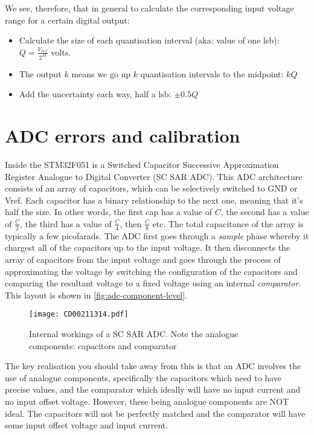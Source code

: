 We see, therefore, that in general to calculate the corresponding input voltage range for a certain digital output:
\begin{itemize}
  \item Calculate the size of each quantisation interval (aka: value of one lsb): \(Q = \frac{V_{ref}}{2^M}\) volts.
  \item The output \(k\) means we go up \(k\) quantisation intervals to the midpoint: \(kQ\)
  \item Add the uncertainty each way, half a lsb: \(\pm 0.5Q\)
\end{itemize}

\section{ADC errors and calibration}
Inside the STM32F051 is a Switched Capacitor Successive Approximation Register Analogue to Digital Converter (SC SAR ADC). 
This ADC architecture consists of an array of capacitors, which can be selectively switched to GND or Vref. 
Each capacitor has a binary relationship to the next one, meaning that it's half the size. 
In other words, the first cap has a value of \(C\), the second has a value of \(\frac{C}{2}\), the third has a value of \(\frac{C}{4}\), then \(\frac{C}{8}\) etc.
The total capacitance of the array is typically a few picofarads. 
The ADC first goes through a \emph{sample} phase whereby it chargest all of the capacitors up to the input voltage. It then disconnects the array of capacitors from the input voltage and goes through the process of approximating the voltage by switching the configuration of the capacitors and comparing the resultant voltage to a fixed voltage using an internal \emph{comparator}. This layout is shown in \autoref{fig:adc-component-level}. 

\begin{figure}
\centering
\texttt{[image: CD00211314.pdf]}
\caption{Internal workings of a SC SAR ADC. Note the analogue components: capacitors and comparator}
\label{fig:adc-component-level}
\end{figure}

The key realisation you should take away from this is that an ADC involves the use of analogue components, specifically the capacitors which need to have precise values, and the comparator which ideally will have no input current and no input offset voltage. However, these being analogue components are NOT ideal. The capacitors will not be perfectly matched and the comparator will have some input offset voltage and input current.

